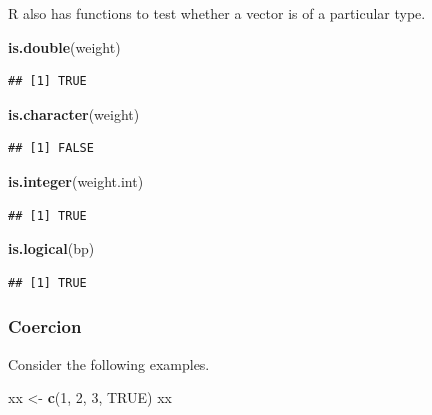 \documentclass[
]{krantz}
\newenvironment{Shaded}{\begin{snugshade}}{\end{snugshade}}
\newcommand{\DecValTok}[1]{\textcolor[rgb]{0.00,0.00,0.81}{#1}}
\newcommand{\KeywordTok}[1]{\textcolor[rgb]{0.13,0.29,0.53}{\textbf{#1}}}
\newcommand{\NormalTok}[1]{#1}
\newcommand{\OtherTok}[1]{\textcolor[rgb]{0.56,0.35,0.01}{#1}}
\newcommand{\StringTok}[1]{\textcolor[rgb]{0.31,0.60,0.02}{#1}}
\begin{document}
R also has functions to test whether a vector is of a particular type.

\begin{Shaded}
\begin{Highlighting}[]
\KeywordTok{is.double}\NormalTok{(weight)}
\end{Highlighting}
\end{Shaded}

\begin{verbatim}
## [1] TRUE
\end{verbatim}

\begin{Shaded}
\begin{Highlighting}[]
\KeywordTok{is.character}\NormalTok{(weight)}
\end{Highlighting}
\end{Shaded}

\begin{verbatim}
## [1] FALSE
\end{verbatim}

\begin{Shaded}
\begin{Highlighting}[]
\KeywordTok{is.integer}\NormalTok{(weight.int)}
\end{Highlighting}
\end{Shaded}

\begin{verbatim}
## [1] TRUE
\end{verbatim}

\begin{Shaded}
\begin{Highlighting}[]
\KeywordTok{is.logical}\NormalTok{(bp)}
\end{Highlighting}
\end{Shaded}

\begin{verbatim}
## [1] TRUE
\end{verbatim}

\hypertarget{coercion}{%
\subsubsection{Coercion}\label{coercion}}

Consider the following examples.

\begin{Shaded}
\begin{Highlighting}[]
\NormalTok{xx \textless{}{-}}\StringTok{ }\KeywordTok{c}\NormalTok{(}\DecValTok{1}\NormalTok{, }\DecValTok{2}\NormalTok{, }\DecValTok{3}\NormalTok{, }\OtherTok{TRUE}\NormalTok{)}
\NormalTok{xx}
\end{Highlighting}
\end{Shaded}
\end{document}
